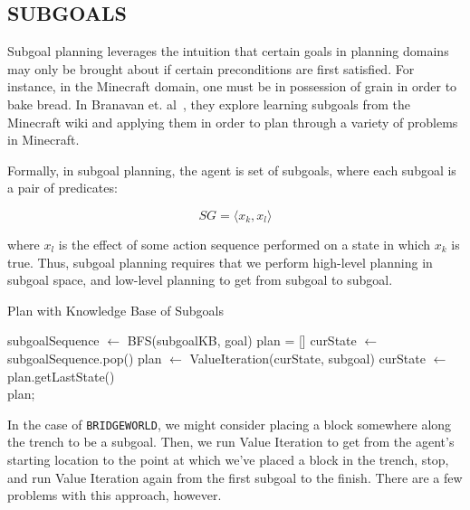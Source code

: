\documentclass[]{article}
\begin{document}
\subsection{SUBGOALS}
Subgoal planning leverages the intuition that certain goals in planning domains may only be brought about if certain preconditions are first satisfied. For instance, in the Minecraft domain, one must be in possession of grain in order to bake bread. In Branavan et. al~\citep{branavan12a}, they explore learning subgoals from the Minecraft wiki and applying them in order to plan through a variety of problems in Minecraft.

Formally, in subgoal planning, the agent is set of subgoals, where each subgoal is a pair of predicates:

\[ 
SG = \langle x_k, x_l \rangle
\]

where $x_l$ is the effect of some action sequence performed on a state in which $x_k$ is true. Thus, subgoal planning requires that we perform high-level planning in subgoal space, and low-level planning to get from subgoal to subgoal.


\begin{algorithm}
  \caption{Plan with Knowledge Base of Subgoals}
  \begin{algorithmic}[1]
    \State subgoalSequence $\gets$ BFS(subgoalKB, goal)
    \State plan = []
    \State curState $\gets$ subgoalSequence.pop()
    		\State plan $\gets$ ValueIteration(curState, subgoal)
		\State curState $\gets$ plan.getLastState()
    \EndFor \\
    \Return plan;
  \end{algorithmic}
\end{algorithm}

In the case of \texttt{BRIDGEWORLD}, we might consider placing a block somewhere along the trench to be a subgoal. Then, we run Value Iteration to get from the agent's starting location to the point at which we've placed a block in the trench, stop, and run Value Iteration again from the first subgoal to the finish. There are a few problems with this approach, however.

\end{document}
